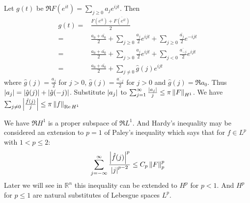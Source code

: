 \begin{remark}[Errata of $\Re{H^1}$]
    Let $g(t)$ be $\Re{F(e^{it})}=\sum_{j\geq 0}{a_je^{i j t}}$. Then
    \begin{align*}
        g(t)= & \frac{F(e^{it})+\overline{F(e^{it})}}{2}                                                                       \\
        =     & \frac{a_0+\bar{a_0}}{2}+\sum_{j\geq 0}{\frac{a_j}{2}e^{i j t}}+\sum_{j\geq 0}{\frac{\bar{a_j}}{2}e^{-i j t}}   \\
        =     & \frac{a_0+\bar{a_0}}{2}+\sum_{j> 0}{\frac{a_j}{2} e^{i j t}}+\sum_{j< 0}{\frac{\overline{a_{-j}}}{2}e^{i j t}} \\
        =     & \frac{a_0+\bar{a_0}}{2}+\sum_{j\neq 0}{\hat{g}(j) e^{i j t}}
    \end{align*}
    {\color{red}where $\hat{g}(j)=\frac{a_j}{2}$ for $j>0$, $\hat{g}(j)=\frac{\overline{a_{-j}}}{2}$ for $j>0$ and $\hat{g}(j)=\Re{a_0}$}.
    Thus $\left\lvert a_j\right\rvert=\left\lvert\hat{g}(j)\right\rvert+\left\lvert\hat{g}(-j)\right\rvert$. Substitute $\left\lvert a_j\right\rvert$ to $\sum_{j=1}^\infty{\frac{\left\lvert a_j\right\rvert}{j}}\leq \pi\left\lVert F\right\rVert_{H^1}$.
    We have $\sum_{j\neq 0}{\left\lvert\frac{\hat{f}(j)}{j}\right\rvert}\leq \pi\left\lVert f\right\rVert_{\operatorname{Re}{H^1}}$
\end{remark}
We have $\Re{H^1}$ is a proper subspace of $\Re{L^1}$. And Hardy's inequality may be considered an extension to $p=1$ of Paley's
inequality which says that for $f\in L^p$ with $1<p\leq 2$:
\begin{equation*}
    \sum_{j=-\infty}^\infty{\frac{\left\lvert\hat{f}(j)\right\rvert^p}{\left\lvert j\right\rvert^{p-2}}}\leq C_p\left\lVert F\right\rVert_p^p
\end{equation*}
Later we will see in $\mathbb{R}^n$ this inequality can be extended to $H^p$ for $p<1$. And $H^p$ for $p\leq 1$ are natural substitutes of
Lebesgue spaces $L^p$.
